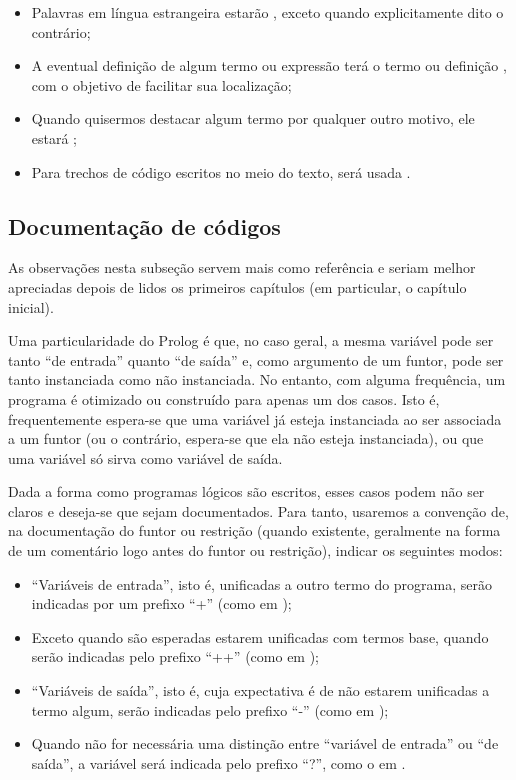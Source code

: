   \begin{itemize}
    \item Palavras em língua estrangeira estarão ,
      exceto quando explicitamente dito o contrário;
    \item A eventual definição de algum termo ou expressão terá o
      termo ou definição , com o objetivo de
      facilitar sua localização;
    \item Quando quisermos destacar algum termo por qualquer outro
      motivo, ele estará ;
    \item Para trechos de código escritos no meio do texto, será usada
      .
  \end{itemize}

\subsection*{Documentação de códigos}

As observações nesta subseção servem mais como referência e seriam
melhor apreciadas depois de lidos os primeiros capítulos (em
particular, o capítulo inicial).

Uma particularidade do Prolog é que, no caso geral, a mesma variável
pode ser tanto ``de entrada'' quanto ``de saída'' e, como argumento de
um funtor, pode ser tanto instanciada como não instanciada. No
entanto, com alguma frequência, um programa é otimizado ou construído
para apenas um dos casos. Isto é, frequentemente espera-se que uma
variável já esteja instanciada ao ser associada a um funtor (ou o
contrário, espera-se que ela não esteja instanciada), ou que uma
variável só sirva como variável de saída.

Dada a forma como programas lógicos são escritos, esses casos podem
não ser claros e deseja-se que sejam documentados. Para tanto,
usaremos a convenção de, na documentação do funtor ou restrição
(quando existente, geralmente na forma de um comentário logo antes do
funtor ou restrição), indicar os seguintes modos:

\begin{itemize}
\item ``Variáveis de entrada'', isto é, unificadas a outro termo
  do programa, serão indicadas por um prefixo ``+'' (como em
  );
\item Exceto quando são esperadas estarem unificadas com termos
  base, quando serão indicadas pelo prefixo ``++'' (como em
  );
\item ``Variáveis de saída'', isto é, cuja expectativa é de não
  estarem unificadas a termo algum, serão indicadas pelo prefixo
  ``-'' (como em );
\item Quando não for necessária uma distinção entre ``variável de
  entrada'' ou ``de saída'', a variável será indicada pelo prefixo
  ``?'', como o  em .
\end{itemize}

